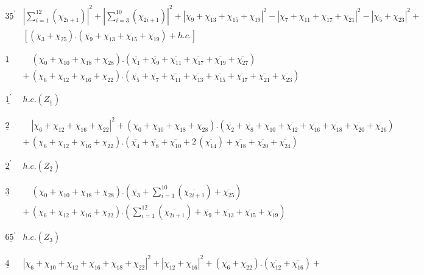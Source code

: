 \documentclass[a4paper,11pt]{article}
\providecommand{\ch}[1]{\chi_{#1}}
\providecommand{\och}[1]{\overline{\chi_{#1}}}
\providecommand{\ud}[1]{\underline{#1}}
\providecommand{\xaa}[2]{|\chi_{#1} + \chi_{#2}|^2}
\providecommand{\xaaaa}[4]{|\chi_{#1} + \chi_{#2}+ \chi_{#3}+ \chi_{#4}|^2}
\providecommand{\xaaaaaa}[6]{|\chi_{#1} + \chi_{#2}+ \chi_{#3}+ \chi_{#4}+
                             \chi_{#5} + \chi_{#6}|^2}
\begin{document}
\begin{table}
$${\begin{array}{|c||l|}
\hline
{}  & {}  \\
\ud{35^{'}}  & |\sum_{i=1}^{12}(\ch{2i+1})|^{2} +
|\sum_{i=3}^{10}(\ch{2i+1})|^{2} +
          \xaaaa{9}{13}{15}{19} - \xaaaa{7}{11}{17}{21} - \xaa{5}{23} + \\
{}  & [(\ch{3} + \ch{25}).(\och{9} + \och{13} + \och{15} + \och{19}) + h.c.] \\
{}  & {} \\
\hline
\hline
{}  &  {}  \\
\ud1  &  \quad (\ch{0} + \ch{10} + \ch{18} + \ch{28}).
(\och{1} + \och{9} + \och{11} + \och{17} + \och{19} + \och{27})
           \\
{}  & + \,(\ch{6} + \ch{12} + \ch{16} + \ch{22}).
(\och{5} + \och{7} + \och{11} + \och{13} + \och{15} + \och{17}
+ \och{21} + \och{23})\\
{}  &  {}  \\
\hline
{}  &  {}  \\
\ud{1^{'}}  &  h.c. (Z_{\ud1}) \\
{}  &  {}  \\
\hline
{}  &  {} \\
\ud2  & \quad \xaaaa{6}{12}{16}{22} + (\ch{0} +\ch{10} + \ch{18} +
\ch{28}).(\och{2} + \och{8} + \och{10} + \och{12} + \och{16} +
\och{18} + \och{20} + \och{26}) \\
{}  & + \, (\ch{6} +\ch{12} + \ch{16} + \ch{22}).(\och{4} + \och{8} +
\och{10} + 2\,(\och{14}) + \och{18} + \och{20} + \och{24}) \\
{}  & {} \\
\hline
{}  &  {} \\
\ud{2^{'}}  &  h.c. (Z_{\ud2}) \\
{}  &  {}  \\
\hline
{}  &  {} \\
\ud3  &  \quad (\ch{0} +\ch{10} + \ch{18} + \ch{28}) .\left( \och{3}
+ \sum_{i=3}^{10}(\och{2i+1}) + \och{25} \right)  \\
{}  & + \, (\ch{6} +\ch{12} + \ch{16} + \ch{22}). \left(
\sum_{i=1}^{12}(\och{2i+1}) + \och{9} + \och{13} + \och{15}
+ \och{19} \right)\\
{}  & {} \\
\hline
{}  & {} \\
\ud{65^{'}}  &  h.c. (Z_{\ud3}) \\
{}  &  {}  \\
\hline
{}  &  {}  \\
\ud4  & \xaaaaaa{6}{10}{12}{16}{18}{22} + \xaa{12}{16} + (\ch{6} +
\ch{22}).(\och{12} + \och{16}) + \\

\end{array}}$$
\end{table}
\end{document}
